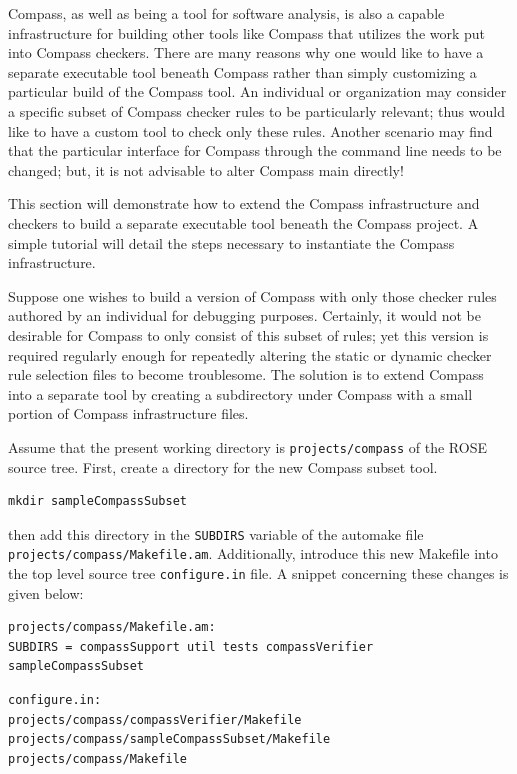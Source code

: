 Compass, as well as being a tool for software analysis, is also a capable
infrastructure for building other tools like Compass that utilizes the work
put into Compass checkers. There are many reasons why one would like to have 
a separate executable tool beneath Compass rather than simply customizing a
particular build of the Compass tool. An individual or organization may
consider a specific subset of Compass checker rules to be particularly
relevant; thus would like to have a custom tool to check only these rules.
Another scenario may find that the particular interface for Compass through
the command line needs to be changed; but, it is not advisable to alter
Compass main directly! 

This section will demonstrate how to extend the Compass
infrastructure and checkers to build a separate executable tool beneath
the Compass project. A simple tutorial will detail the steps necessary
to instantiate the Compass infrastructure.

Suppose one wishes to build a version of Compass with only those checker rules
authored by an individual for debugging purposes. Certainly, it would not
be desirable for Compass to only consist of this subset of rules; yet
this version is required regularly enough for repeatedly altering
the static or dynamic checker rule selection files to become troublesome.
The solution is to extend Compass into a separate tool
by creating a subdirectory under Compass with a small portion of Compass 
infrastructure files.

Assume that the present working directory is {\tt projects/compass} of the ROSE
source tree. First, create a directory for the new Compass subset tool.
%
\begin{verbatim}
mkdir sampleCompassSubset
\end{verbatim}
%
then add this directory in the {\tt SUBDIRS} variable of the automake file
{\tt projects/compass/Makefile.am}. Additionally, introduce this new Makefile
into the top level source tree {\tt configure.in} file. A snippet concerning
these changes is given below:
%
\begin{verbatim}
projects/compass/Makefile.am:
SUBDIRS = compassSupport util tests compassVerifier sampleCompassSubset
\end{verbatim}
%
\begin{verbatim}
configure.in:
projects/compass/compassVerifier/Makefile
projects/compass/sampleCompassSubset/Makefile
projects/compass/Makefile
\end{verbatim}
%

